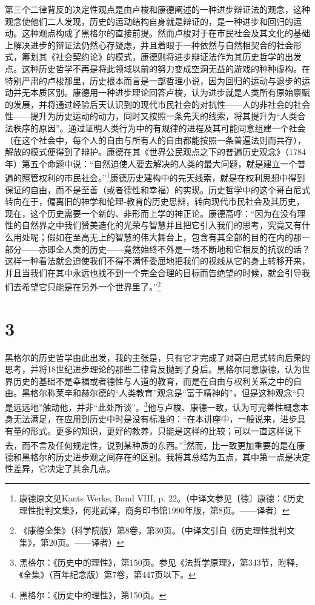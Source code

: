 第三个二律背反的决定性观点是由卢梭和康德阐述的一种进步辩证法的观念，这种观念使他们二人发现，历史的运动结构自身就是辩证的，是一种进步和回归的运动。这种观点构成了黑格尔的直接前提。然而卢梭对于在市民社会及其文化的基础上解决进步的辩证法仍然心存疑虑，并且着眼于一种依然与自然相契合的社会形式，筹划其《社会契约论》的模式，康德则将进步辩证法作为其历史哲学的出发点。这种历史哲学不再是将此领域以前的努力变成空洞无益的游戏的种种虚构。在特别严肃的卢梭那里，历史根本而言是一部哲理小说，因为回归的运动与退步的运动并无本质区别。康德用一种进步理论回答卢梭，认为进步就是人类所有原始禀赋的发展，并将通过经验后天认识到的现代市民社会的对抗性——人的非社会的社会性——提升为历史运动的动力，同时又按照一条先天的线索，将其提升为“人类合法秩序的原因”。通过证明人类行为中的有规律的进程及其可能同意组建一个社会（在这个社会中，每个人的自由与所有人的自由都能按照一条普遍法则而共存），解放的模式便得到了辩护。康德在其《世界公民观点之下的普遍历史观念》（1784年）第五个命题中说：“自然迫使人要去解决的人类的最大问题，就是建立一个普遍的照管权利的市民社会。”\footnote{康德原文见Kants Werke, Band VIII, p. 22。（中译文参见〔德〕康德：《历史理性批判文集》，何兆武译，商务印书馆1990年版，第8页。——译者）}康德历史建构中的先天线索，就是在权利思想中得到保证的自由，而不是至善（或者德性和幸福）的实现。历史哲学中的这个哥白尼式转向在于，偏离旧的神学和伦理-教育的历史思辨，转向现代市民社会及其历史，现在，这个历史需要一个新的、非形而上学的神正论。康德高呼：“因为在没有理性的自然界之中我们赞美造化的光荣与智慧并且把它引入我们的思考，究竟又有什么用处呢；假如在至高无上的智慧的伟大舞台上，包含有其全部的目的在内的那一部分——亦即全人类的历史——竟然始终不外是一场不断地和它相反的抗议的话？这样一种看法就会迫使我们不得不满怀委屈地把我们的视线从它的身上转移开来，并且当我们在其中永远也找不到一个完全合理的目标而告绝望的时候，就会引导我们去希望它只能是在另外一个世界里了。”\footnote{《康德全集》（科学院版）第8卷，第30页。（中译文引自《历史理性批判文集》，第20页。——译者）}

\section*{3}

黑格尔的历史哲学由此出发，我的主张是，只有它才完成了对哥白尼式转向后果的思考，并将18世纪进步理论的那些二律背反抛到了身后。黑格尔同意康德，认为世界历史的基础不是幸福或者德性与人道的教育，而是在自由与权利关系之中的自由。黑格尔称莱辛和赫尔德的“人类教育”观念是“富于精神的”，但是这种观念“只是远远地”触动他，并非“此处所谈”。\footnote{黑格尔：《历史中的理性》，第150页。参见《法哲学原理》，第343节，附释，《全集》（百年纪念版）第7卷，第447页以下。}他与卢梭、康德一致，认为可完善性概念本身无法满足，在应用到历史中时是没有标准的：“在本讲座中，一般说来，进步具有量的形式。更多的知识，更好的教养，只能是这样的比较；可以一直这样说下去，而不言及任何规定性，说到某种质的东西。”\footnote{黑格尔：《历史中的理性》，第150页。}然而，比一致更加重要的是在康德和黑格尔的历史进步观之间存在的区别。我将其总结为五点，其中第一点是决定性差异，它决定了其余几点。

